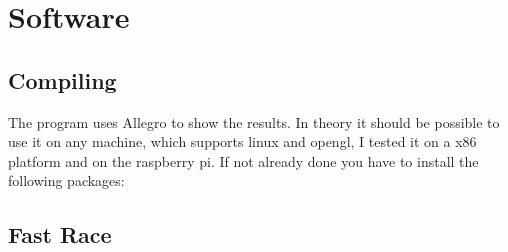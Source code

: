 \documentclass[11pt, a4paper, UKenglish, parskip=half+]{scrbook}
\begin{document}
\begin{comment}
	
\begin{tikzpicture}[scale=2]
  \draw[color=black, thick]
  \foreach \i in {0,...,1}
  {
  	\foreach \j in {0,...,20}
  	{
  		(\i/4,\j/4) to [short,o-] (\i/4,\j/4){}
  	}
  }
  
    (1,0) to [short,o-] (6,0){} %
    (0,1) node[]{\large{\textbf{RASPBERRY PI}}}
    (5,0) node[ground]{} node[circ](4.5,0){}
    (0,2) to [pC, l=$C_1$, o-] (0.5,2)
    to [R,l=$R_1$,](1.5,2)
    to node[short]{}(2.6,2)
    (1.5,2) to [C, l=$C_2$, *-] (1.5,3) -| (5,3)
    (2.2,2) to [R, l=$R_2$, *-*] (2.2,3)
    (2.2,3) to [pC, l=$C_3$, *-] (2.2,5) -| (3,5)
    (3,0) to [R,l=$R_5$,-*] (3,1.5)
    to [Tnpn,n=npn1] (3,2.5)
    (npn1.E) node[right=3mm, above=5mm]{$Q_1$} %
    (4,0) to [pC, l_=$C_4$, *-] (4, 1.5)--(3,1.5)
    (2.2,0) to [vR, l=$R_3$, *-*] (2.2,2)
    (3,2.5) to node[short]{}(3,3)
    (3,5) to [pR, n=pot1, l_=$R_4$, *-] (3,3)
    (3,5) to [R, l=$R_6$, *-] (5,5)
    to [short,*-o](5,5.5) node[right]{$V_S=40 V$}
    (5,3) to [Tnigfetd,n=mos1] (5,5)
    (mos1.B) node[anchor=west]{$Q_2$} %
    (pot1.wiper)  to [R, l=$R_7$] (4.5,4) -| (mos1.G)
    (5,1.5) to [Tpigfetd,n=mos2] (5,2.5)
    (5,0) to (mos2.S)
    (3,2.5) to [R, l=$R_8$, *-] (4.5,2.5)
    -| (mos2.G)
    (mos2.B) node[anchor=west]{$Q_3$} %
    (6,3) to [pC, l=$C_5$,-*](5,3)
    (6,3) to [short,-o] (6,2){}
    (mos1.S)--(mos2.D)
    (6,0) to [short,-o] (6,1){} node[above=7mm]{\large{\textbf{SPEAKER}}}
    ;
\end{tikzpicture}
\end{comment}
\chapter{Software}
\section{Compiling}
The program uses Allegro to show the results. In theory it should be possible to use it on any machine, which supports linux and opengl, I tested it on a x86 platform and on the raspberry pi. If not already done you have to install the following packages:
\section{Fast Race}
\end{document}
